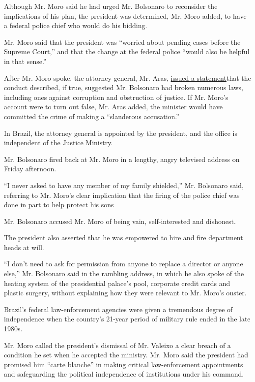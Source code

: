 Although Mr. Moro said he had urged Mr. Bolsonaro to reconsider the
implications of his plan, the president was determined, Mr. Moro added,
to have a federal police chief who would do his bidding.

Mr. Moro said that the president was ``worried about pending cases
before the Supreme Court,'' and that the change at the federal police
``would also be helpful in that sense.''

After Mr. Moro spoke, the attorney general, Mr. Aras,
\href{http://www.mpf.mp.br/pgr/noticias-pgr/augusto-aras-solicita-inquerito-ao-stf-para-apurar-fatos-narrados-e-declaracoes-de-sergio-moro/}{issued
a statement}that the conduct described, if true, suggested Mr. Bolsonaro
had broken numerous laws, including ones against corruption and
obstruction of justice. If Mr. Moro's account were to turn out false,
Mr. Aras added, the minister would have committed the crime of making a
``slanderous accusation.''

In Brazil, the attorney general is appointed by the president, and the
office is independent of the Justice Ministry.

Mr. Bolsonaro fired back at Mr. Moro in a lengthy, angry televised
address on Friday afternoon.

``I never asked to have any member of my family shielded,'' Mr.
Bolsonaro said, referring to Mr. Moro's clear implication that the
firing of the police chief was done in part to help protect his sons

Mr. Bolsonaro accused Mr. Moro of being vain, self-interested and
dishonest.

The president also asserted that he was empowered to hire and fire
department heads at will.

``I don't need to ask for permission from anyone to replace a director
or anyone else,'' Mr. Bolsonaro said in the rambling address, in which
he also spoke of the heating system of the presidential palace's pool,
corporate credit cards and plastic surgery, without explaining how they
were relevant to Mr. Moro's ouster.

Brazil's federal law-enforcement agencies were given a tremendous degree
of independence when the country's 21-year period of military rule ended
in the late 1980s.

Mr. Moro called the president's dismissal of Mr. Valeixo a clear breach
of a condition he set when he accepted the ministry. Mr. Moro said the
president had promised him ``carte blanche'' in making critical
law-enforcement appointments and safeguarding the political independence
of institutions under his command.


